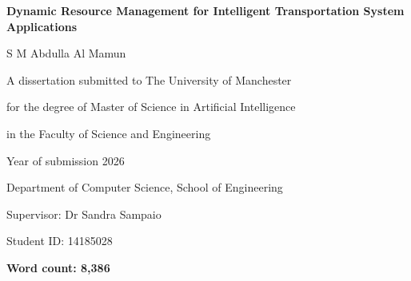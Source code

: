 \documentclass[12pt,a4paper]{article}
\begin{document}
\thispagestyle{empty}
\begin{center}
\vspace*{12mm}
\parbox{0.72\textwidth}{\centering\Large\bfseries Dynamic Resource Management for Intelligent Transportation System Applications\par}\par
\vspace{18mm}
{\large S M Abdulla Al Mamun\par}
\vspace{12mm}
A dissertation submitted to The University of Manchester\par
for the degree of Master of Science in Artificial Intelligence\par
in the Faculty of Science and Engineering\par
\vspace{8mm}
Year of submission 2026\par
\vspace{8mm}
Department of Computer Science, School of Engineering\par
\vspace{8mm}
Supervisor: Dr Sandra Sampaio\par
\end{center}
\vfill
\noindent Student ID: 14185028\par
\clearpage
\begingroup
\makeatletter
\let\SecondPassSectionEntry\l@section
\renewcommand{\l@section}[2]{\SecondPassSectionEntry{#1\hspace{1em}}{#2}}
\let\SecondPassSubsectionEntry\l@subsection
\renewcommand{\l@subsection}[2]{\SecondPassSubsectionEntry{#1\hspace{1em}}{#2}}
\makeatother
\tableofcontents
\endgroup
\vfill\noindent\textbf{Word count: 8,386}\par
\clearpage
{\footnotesize\singlespacing
\listoffigures
\listoftables
}
\clearpage
\end{document}
